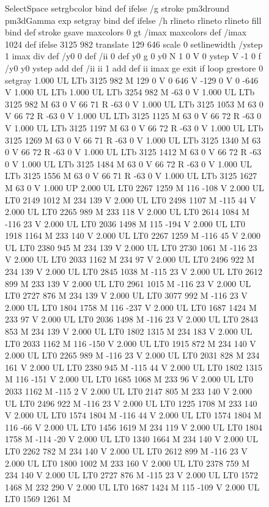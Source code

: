 \documentclass{LMCS}
\begin{document}
\begin{figure}[!tbp]
\begin{minipage}[b]{.47\linewidth}
{{{{{{       SelectSpace setrgbcolor} bind def
  } ifelse
}{
  /g {stroke pm3dround pm3dGamma exp setgray} bind def
} ifelse
/h {rlineto rlineto rlineto fill} bind def
stroke gsave	maxcolors 0 gt {/imax maxcolors def} {/imax 1024 def} ifelse
3125 982 translate 129 646 scale 0 setlinewidth
/ystep 1 imax div def /y0 0 def /ii 0 def
{ y0 g 0 y0 N 1 0 V 0 ystep V -1 0 f
/y0 y0 ystep add def /ii ii 1 add def
ii imax ge {exit} if } loop
grestore 0 setgray
1.000 UL
LTb
3125 982 M
129 0 V
0 646 V
-129 0 V
0 -646 V
1.000 UL
LTb
1.000 UL
LTb
3254 982 M
-63 0 V
1.000 UL
LTb
3125 982 M
63 0 V
66 71 R
-63 0 V
1.000 UL
LTb
3125 1053 M
63 0 V
66 72 R
-63 0 V
1.000 UL
LTb
3125 1125 M
63 0 V
66 72 R
-63 0 V
1.000 UL
LTb
3125 1197 M
63 0 V
66 72 R
-63 0 V
1.000 UL
LTb
3125 1269 M
63 0 V
66 71 R
-63 0 V
1.000 UL
LTb
3125 1340 M
63 0 V
66 72 R
-63 0 V
1.000 UL
LTb
3125 1412 M
63 0 V
66 72 R
-63 0 V
1.000 UL
LTb
3125 1484 M
63 0 V
66 72 R
-63 0 V
1.000 UL
LTb
3125 1556 M
63 0 V
66 71 R
-63 0 V
1.000 UL
LTb
3125 1627 M
63 0 V
1.000 UP
2.000 UL
LT0
2267 1259 M
116 -108 V
2.000 UL
LT0
2149 1012 M
234 139 V
2.000 UL
LT0
2498 1107 M
-115 44 V
2.000 UL
LT0
2265 989 M
233 118 V
2.000 UL
LT0
2614 1084 M
-116 23 V
2.000 UL
LT0
2036 1498 M
115 -194 V
2.000 UL
LT0
1918 1164 M
233 140 V
2.000 UL
LT0
2267 1259 M
-116 45 V
2.000 UL
LT0
2380 945 M
234 139 V
2.000 UL
LT0
2730 1061 M
-116 23 V
2.000 UL
LT0
2033 1162 M
234 97 V
2.000 UL
LT0
2496 922 M
234 139 V
2.000 UL
LT0
2845 1038 M
-115 23 V
2.000 UL
LT0
2612 899 M
233 139 V
2.000 UL
LT0
2961 1015 M
-116 23 V
2.000 UL
LT0
2727 876 M
234 139 V
2.000 UL
LT0
3077 992 M
-116 23 V
2.000 UL
LT0
1804 1758 M
116 -237 V
2.000 UL
LT0
1687 1424 M
233 97 V
2.000 UL
LT0
2036 1498 M
-116 23 V
2.000 UL
LT0
2843 853 M
234 139 V
2.000 UL
LT0
1802 1315 M
234 183 V
2.000 UL
LT0
2033 1162 M
116 -150 V
2.000 UL
LT0
1915 872 M
234 140 V
2.000 UL
LT0
2265 989 M
-116 23 V
2.000 UL
LT0
2031 828 M
234 161 V
2.000 UL
LT0
2380 945 M
-115 44 V
2.000 UL
LT0
1802 1315 M
116 -151 V
2.000 UL
LT0
1685 1068 M
233 96 V
2.000 UL
LT0
2033 1162 M
-115 2 V
2.000 UL
LT0
2147 805 M
233 140 V
2.000 UL
LT0
2496 922 M
-116 23 V
2.000 UL
LT0
1225 1708 M
233 140 V
2.000 UL
LT0
1574 1804 M
-116 44 V
2.000 UL
LT0
1574 1804 M
116 -66 V
2.000 UL
LT0
1456 1619 M
234 119 V
2.000 UL
LT0
1804 1758 M
-114 -20 V
2.000 UL
LT0
1340 1664 M
234 140 V
2.000 UL
LT0
2262 782 M
234 140 V
2.000 UL
LT0
2612 899 M
-116 23 V
2.000 UL
LT0
1800 1002 M
233 160 V
2.000 UL
LT0
2378 759 M
234 140 V
2.000 UL
LT0
2727 876 M
-115 23 V
2.000 UL
LT0
1572 1468 M
232 290 V
2.000 UL
LT0
1687 1424 M
115 -109 V
2.000 UL
LT0
1569 1261 M
}}}
\end{minipage}
\end{figure}
\end{document}

